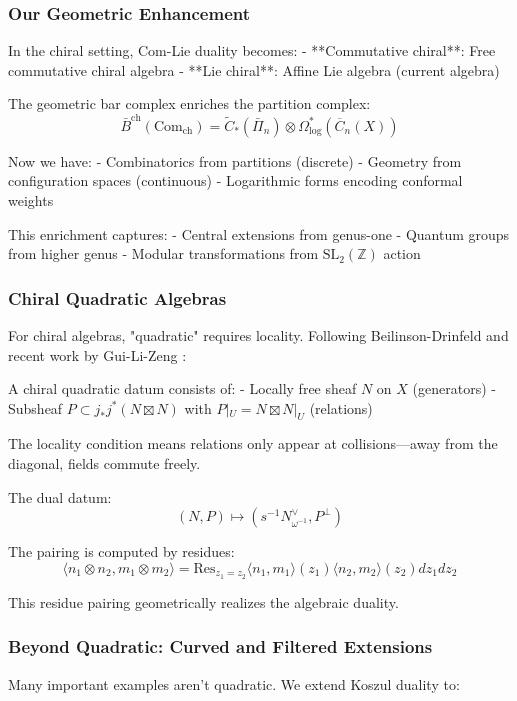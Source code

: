 \subsubsection{Our Geometric Enhancement}

In the chiral setting, Com-Lie duality becomes:
- **Commutative chiral**: Free commutative chiral algebra
- **Lie chiral**: Affine Lie algebra (current algebra)

The geometric bar complex enriches the partition complex:
$$\bar{B}^{\text{ch}}(\text{Com}_{\text{ch}}) = \tilde{C}_*(\bar{\Pi}_n) \otimes \Omega^*_{\text{log}}(\overline{C}_n(X))$$

Now we have:
- Combinatorics from partitions (discrete)
- Geometry from configuration spaces (continuous)
- Logarithmic forms encoding conformal weights

This enrichment captures:
- Central extensions from genus-one  
- Quantum groups from higher genus
- Modular transformations from $\text{SL}_2(\mathbb{Z})$ action

\subsubsection{Chiral Quadratic Algebras}

For chiral algebras, "quadratic" requires locality. Following Beilinson-Drinfeld and recent work by Gui-Li-Zeng \cite{GL22}:

A chiral quadratic datum consists of:
- Locally free sheaf $N$ on $X$ (generators)
- Subsheaf $P \subset j_*j^*(N \boxtimes N)$ with $P|_U = N \boxtimes N|_U$ (relations)

The locality condition means relations only appear at collisions—away from the diagonal, fields commute freely.

The dual datum:
$$(N, P) \mapsto (s^{-1}N^{\vee}_{\omega^{-1}}, P^\perp)$$

The pairing is computed by residues:
$$\langle n_1 \otimes n_2, m_1 \otimes m_2 \rangle = \text{Res}_{z_1 = z_2} \langle n_1, m_1 \rangle(z_1) \langle n_2, m_2 \rangle(z_2) dz_1 dz_2$$

This residue pairing geometrically realizes the algebraic duality.

\subsubsection{Beyond Quadratic: Curved and Filtered Extensions}

Many important examples aren't quadratic. We extend Koszul duality to:


